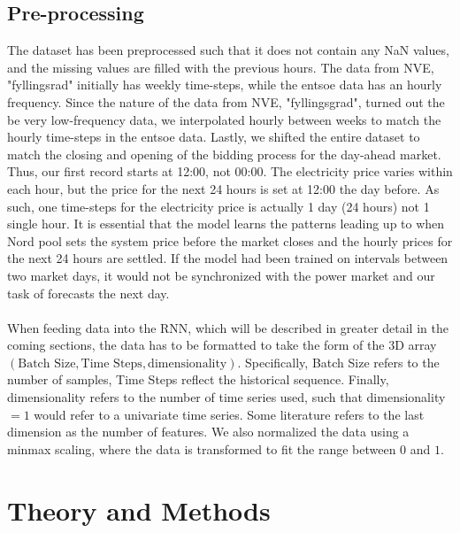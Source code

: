\documentclass
[twocolumn,
secnumarabic,
nobibnotes,
aps,
prl,
reprint,
groupedaddress,
amsmath,
amssymb,
]{revtex4-2}
\begin{document}
\subsection{Pre-processing}
The dataset has been preprocessed such that it does not contain any NaN values, and the missing values are filled with the previous hours. The data from NVE, "fyllingsrad" initially has weekly time-steps, while the entsoe data has an hourly frequency. Since the nature of the data from NVE, "fyllingsgrad", turned out the be very low-frequency data, we interpolated hourly between weeks to match the hourly time-steps in the entsoe data. Lastly, we shifted the entire dataset to match the closing and opening of the bidding process for the day-ahead market. Thus, our first record starts at 12:00, not 00:00. The electricity price varies within each hour, but the price for the next 24 hours is set at 12:00 the day before. As such, one time-steps for the electricity price is actually 1 day (24 hours) not 1 single hour. It is essential that the model learns the patterns leading up to when Nord pool sets the system price before the market closes and the hourly prices for the next 24 hours are settled. If the model had been trained on intervals between two market days, it would not be synchronized with the power market and our task of forecasts the next day.
\\\\
When feeding data into the RNN, which will be described in greater detail in the coming sections, the data has to be formatted to take the form of the 3D array $\left(\text{Batch Size}, \text{Time Steps}, \text{dimensionality}\right)$. Specifically, Batch Size refers to the number of samples, Time Steps reflect the historical sequence. Finally, dimensionality refers to the number of time series used, such that dimensionality $= 1$ would refer to a univariate time series. Some literature refers to the last dimension as the number of features. We also normalized the data using a minmax scaling, where the data is transformed to fit the range between $0$ and $1$.

\section{Theory and Methods}
\end{document}
